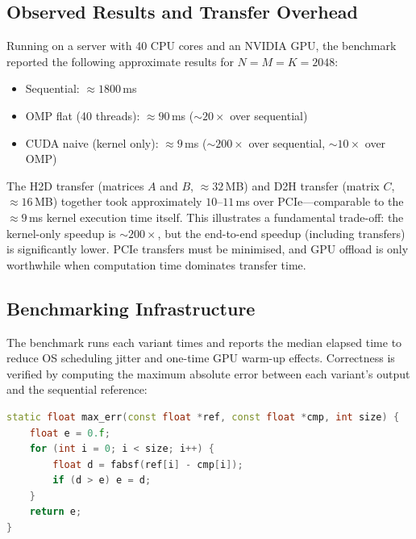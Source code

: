\subsection{Observed Results and Transfer Overhead}
\label{ssec:bench-results}

Running on a server with 40 CPU cores and an NVIDIA GPU, the benchmark
reported the following approximate results for $N = M = K = 2048$:

\begin{itemize}
  \item Sequential: ${\approx}1800$\,ms
  \item OMP flat (40 threads): ${\approx}90$\,ms \quad (${\sim}20\times$ over sequential)
  \item CUDA naive (kernel only): ${\approx}9$\,ms \quad (${\sim}200\times$ over sequential,
    ${\sim}10\times$ over OMP)
\end{itemize}

\begin{ppnote}
The H2D transfer (matrices $A$ and $B$, ${\approx}32$\,MB) and D2H transfer
(matrix $C$, ${\approx}16$\,MB) together took approximately $10$--$11$\,ms
over PCIe---comparable to the ${\approx}9$\,ms kernel execution time itself.
This illustrates a fundamental trade-off: the kernel-only speedup is
${\sim}200\times$, but the end-to-end speedup (including transfers) is
significantly lower. PCIe transfers must be minimised, and GPU offload is only
worthwhile when computation time dominates transfer time.
\end{ppnote}


\subsection{Benchmarking Infrastructure}
\label{ssec:code-bench}

The benchmark runs each variant  times and reports the
median elapsed time to reduce OS scheduling jitter and one-time GPU warm-up
effects. Correctness is verified by computing the maximum absolute error
between each variant's output and the sequential reference:

\begin{lstlisting}[language=C++]
static float max_err(const float *ref, const float *cmp, int size) {
    float e = 0.f;
    for (int i = 0; i < size; i++) {
        float d = fabsf(ref[i] - cmp[i]);
        if (d > e) e = d;
    }
    return e;
}
\end{lstlisting}

